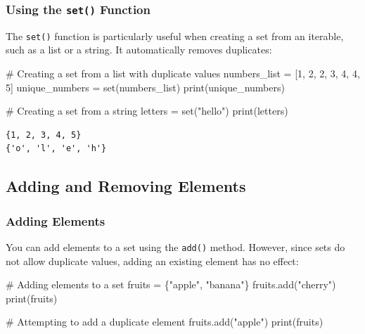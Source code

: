 \documentclass[
  letterpaper,
  DIV=11,
  numbers=noendperiod]{scrreprt}
\newenvironment{Shaded}{\begin{snugshade}}{\end{snugshade}}
\newcommand{\BuiltInTok}[1]{\textcolor[rgb]{0.00,0.23,0.31}{#1}}
\newcommand{\CommentTok}[1]{\textcolor[rgb]{0.37,0.37,0.37}{#1}}
\newcommand{\DecValTok}[1]{\textcolor[rgb]{0.68,0.00,0.00}{#1}}
\newcommand{\NormalTok}[1]{\textcolor[rgb]{0.00,0.23,0.31}{#1}}
\newcommand{\OperatorTok}[1]{\textcolor[rgb]{0.37,0.37,0.37}{#1}}
\newcommand{\StringTok}[1]{\textcolor[rgb]{0.13,0.47,0.30}{#1}}
\begin{document}
\hypertarget{using-the-set-function}{%
\subsubsection{\texorpdfstring{Using the \texttt{set()}
Function}{Using the set() Function}}\label{using-the-set-function}}

The \texttt{set()} function is particularly useful when creating a set
from an iterable, such as a list or a string. It automatically removes
duplicates:

\begin{Shaded}
\begin{Highlighting}[]
\CommentTok{\# Creating a set from a list with duplicate values}
\NormalTok{numbers\_list }\OperatorTok{=}\NormalTok{ [}\DecValTok{1}\NormalTok{, }\DecValTok{2}\NormalTok{, }\DecValTok{2}\NormalTok{, }\DecValTok{3}\NormalTok{, }\DecValTok{4}\NormalTok{, }\DecValTok{4}\NormalTok{, }\DecValTok{5}\NormalTok{]}
\NormalTok{unique\_numbers }\OperatorTok{=} \BuiltInTok{set}\NormalTok{(numbers\_list)}
\BuiltInTok{print}\NormalTok{(unique\_numbers) }

\CommentTok{\# Creating a set from a string}
\NormalTok{letters }\OperatorTok{=} \BuiltInTok{set}\NormalTok{(}\StringTok{"hello"}\NormalTok{)}
\BuiltInTok{print}\NormalTok{(letters)}
\end{Highlighting}
\end{Shaded}

\begin{verbatim}
{1, 2, 3, 4, 5}
{'o', 'l', 'e', 'h'}
\end{verbatim}

\hypertarget{adding-and-removing-elements}{%
\subsection{Adding and Removing
Elements}\label{adding-and-removing-elements}}

\hypertarget{adding-elements-1}{%
\subsubsection{Adding Elements}\label{adding-elements-1}}

You can add elements to a set using the \texttt{add()} method. However,
since sets do not allow duplicate values, adding an existing element has
no effect:

\begin{Shaded}
\begin{Highlighting}[]
\CommentTok{\# Adding elements to a set}
\NormalTok{fruits }\OperatorTok{=}\NormalTok{ \{}\StringTok{"apple"}\NormalTok{, }\StringTok{"banana"}\NormalTok{\}}
\NormalTok{fruits.add(}\StringTok{"cherry"}\NormalTok{)}
\BuiltInTok{print}\NormalTok{(fruits)  }

\CommentTok{\# Attempting to add a duplicate element}
\NormalTok{fruits.add(}\StringTok{"apple"}\NormalTok{)}
\BuiltInTok{print}\NormalTok{(fruits)  }
\end{Highlighting}
\end{Shaded}
\end{document}
